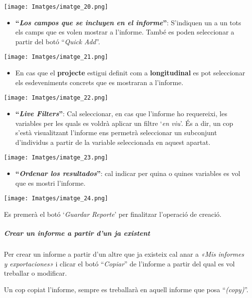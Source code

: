 \documentclass[
]{article}
\providecommand{\tightlist}{%
  \setlength{\itemsep}{0pt}\setlength{\parskip}{0pt}}
\begin{document}
\texttt{[image: Imatges/imatge\_20.png]}

\begin{itemize}
\tightlist
\item
  \textbf{``\emph{Los campos que se incluyen en el informe}''}: S'indiquen un a un tots els camps que es volen mostrar a l'informe. També es poden seleccionar a partir del botó ``\emph{Quick Add}''.
\end{itemize}

\texttt{[image: Imatges/imatge\_21.png]}

\begin{itemize}
\tightlist
\item
  En cas que el \textbf{projecte} estigui definit com a \textbf{longitudinal} es pot seleccionar els esdeveniments concrets que es mostraran a l'informe.
\end{itemize}

\texttt{[image: Imatges/imatge\_22.png]}

\begin{itemize}
\tightlist
\item
  \textbf{``\emph{Live Filters}''}: Cal seleccionar, en cas que l'informe ho requereixi, les variables per les quals es voldrà aplicar un filtre `\emph{en viu}'. És a dir, un cop s'està visualitzant l'informe ens permetrà seleccionar un subconjunt d'individus a partir de la variable seleccionada en aquest apartat.
\end{itemize}

\texttt{[image: Imatges/imatge\_23.png]}

\begin{itemize}
\tightlist
\item
  \textbf{``\emph{Ordenar los resultados}''}: cal indicar per quina o quines variables es vol que es mostri l'informe.
\end{itemize}

\texttt{[image: Imatges/imatge\_24.png]}

Es premerà el botó `\emph{Guardar Reporte}' per finalitzar l'operació de creació.

\hypertarget{en14}{%
\subparagraph{Crear un informe a partir d'un ja existent}\label{en14}}

Per crear un informe a partir d'un altre que ja existeix cal anar a \emph{«Mis informes y exportaciones»} i clicar el botó ``\emph{Copiar}'' de l'informe a partir del qual es vol treballar o modificar.

Un cop copiat l'informe, sempre es treballarà en aquell informe que posa ``\emph{(copy)}''.
\end{document}
